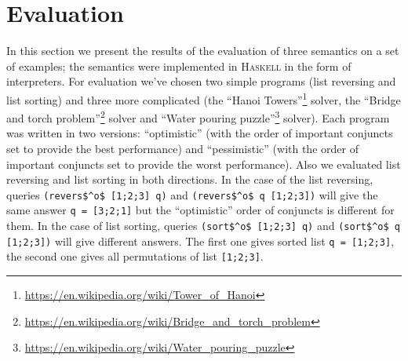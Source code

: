 \section{Evaluation}
\label{sec:eval}

In this section we present the results of the evaluation of three semantics on a set of examples; the semantics were implemented in \textsc{Haskell} in the form of interpreters.
For evaluation we've chosen two simple programs (list reversing and list sorting) and three more complicated (the ``Hanoi Towers''\footnote{\url{https://en.wikipedia.org/wiki/Tower_of_Hanoi}} solver, the
``Bridge and torch problem''\footnote{\url{https://en.wikipedia.org/wiki/Bridge_and_torch_problem}} solver and ``Water pouring puzzle''\footnote{\url{https://en.wikipedia.org/wiki/Water_pouring_puzzle}} solver).
Each program was written in two versions: ``optimistic'' (with the order of important conjuncts set to provide the best performance) and ``pessimistic'' (with the order of important
conjuncts set to provide the worst performance). Also we evaluated list reversing and list sorting in both directions. In the case of the list reversing, queries \lstinline{(revers$^o$ [1;2;3] q)} and \lstinline{(revers$^o$ q [1;2;3])}\! will give the same answer \lstinline{q = [3;2;1]} but the ``optimistic'' order of conjuncts is different for them. In the case of list sorting, queries \lstinline{(sort$^o$ [1;2;3] q)} and \lstinline{(sort$^o$ q [1;2;3])} will give different answers. The first one gives sorted list \lstinline{q = [1;2;3]}, the second one gives all permutations of list \lstinline{[1;2;3]}\!\!. 

